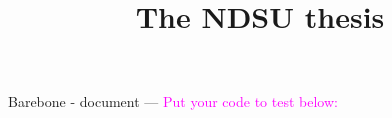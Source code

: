 \documentclass[12pt,mathdesign,showframe]{ndsu-thesis-2022}
\title{The NDSU thesis}
\begin{document}
Barebone - document --- \textcolor{magenta}{Put your code to test below:}
\end{document}
